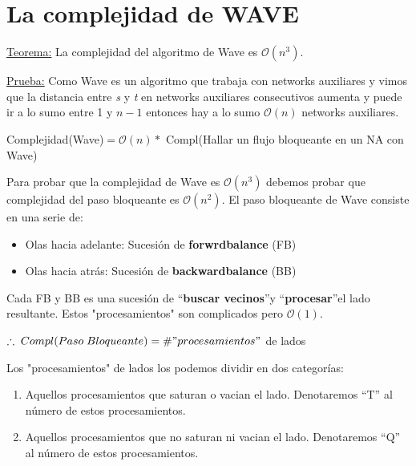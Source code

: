 \documentclass[12pt,a4paper]{report}
\begin{document}
	\section{La complejidad de WAVE}

		\underline{Teorema:} La complejidad del algoritmo de Wave es $\mathcal{O}(n^{3})$.

		\underline{Prueba:} Como Wave es un algoritmo que trabaja con networks auxiliares y vimos que la distancia entre \textit{s} y \textit{t} en networks auxiliares consecutivos aumenta y puede ir a lo sumo entre 1 y $n-1$ entonces hay a lo sumo $\mathcal{O}(n)$ networks auxiliares.

		\begin{center}
			Complejidad(Wave)$ = \mathcal{O}(n) *$ Compl(Hallar un flujo bloqueante en un NA con Wave)
		\end{center}

		Para probar que la complejidad de Wave es $\mathcal{O}(n^{3})$ debemos probar que complejidad del paso bloqueante es $\mathcal{O}(n^{2})$. El paso bloqueante de Wave consiste en una serie de:

		\begin{itemize}
			\item Olas hacia adelante: Sucesión de \textbf{forwrdbalance} (FB)
			\item Olas hacia atrás: Sucesión de \textbf{backwardbalance} (BB)
		\end{itemize}

		Cada FB y BB es una sucesión de \textquotedblleft \textbf{buscar vecinos}\textquotedblright y \textquotedblleft \textbf{procesar}\textquotedblright el lado resultante. Estos "procesamientos" \; son complicados pero $ \mathcal{O}(1)$.

		\begin{center}
		$ \therefore \; Compl(Paso \; Bloqueante) = \# "procesamientos"$ de lados
		\end{center}

		Los "procesamientos" \; de lados los podemos dividir en dos categorías:
		\begin{enumerate}
			\item Aquellos procesamientos que saturan o vacian el lado. Denotaremos \textquotedblleft T\textquotedblright \; al número de estos procesamientos.
			\item Aquellos procesamientos que no saturan ni vacian el lado. Denotaremos \textquotedblleft Q\textquotedblright \; al número de estos procesamientos.
		\end{enumerate}
\end{document}
